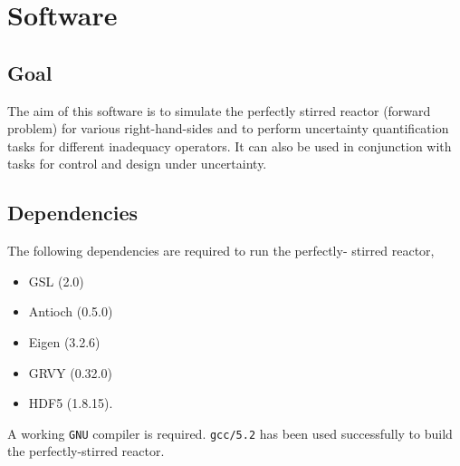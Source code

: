 \section{Software}

\subsection{Goal}
The aim of this software is to simulate the perfectly stirred 
reactor (forward problem) for various right-hand-sides and to 
perform uncertainty quantification tasks for different 
inadequacy operators.  It can also be used in conjunction with 
tasks for control and design under uncertainty.

\subsection{Dependencies}
The following dependencies are required to run the perfectly-
stirred reactor,
\begin{itemize}
  \item GSL     (2.0)
  \item Antioch (0.5.0) 
  \item Eigen (3.2.6)
  \item GRVY (0.32.0)
  \item HDF5 (1.8.15).
\end{itemize}
A working \texttt{GNU} compiler is required.  \texttt{gcc/5.2} 
has been used successfully to build the perfectly-stirred 
reactor.
